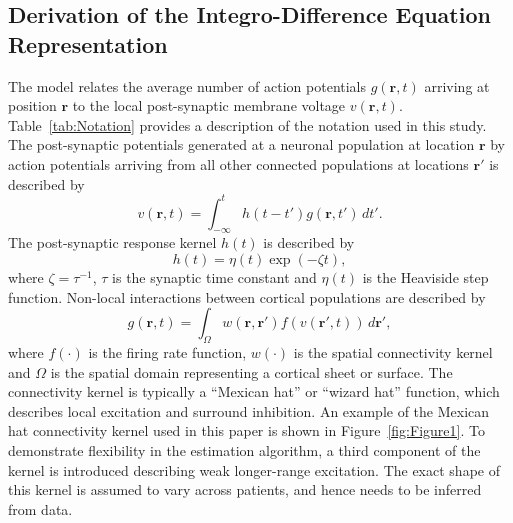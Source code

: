 \documentclass[12pt]{iopart}
\begin{document}
\subsection{Derivation of the Integro-Difference Equation Representation}
The model relates the average number of action potentials $g(\mathbf{r},t)$ arriving at position $\mathbf{r}$ to the local post-synaptic membrane voltage $v(\mathbf{r},t)$. Table~\ref{tab:Notation} provides a description of the notation used in this study. The post-synaptic potentials generated at a neuronal population at location $\mathbf{r}$ by action potentials arriving from all other connected populations at locations $\mathbf{r}'$ is described by 
\begin{equation}
	\label{SpikesToPotential} v\left( {\mathbf{r},t} \right) = \int_{ - \infty }^t {h\left( {t - t'} \right)g\left( {\mathbf{r},t'} \right) \, dt'}. 
\end{equation}
The post-synaptic response kernel $h(t)$ is described by 
\begin{equation}
	\label{SynapticRespKernel} h(t) = \eta(t)\exp{\left(-\zeta t\right)}, 
\end{equation}
where $\zeta=\tau^{-1}$, $\tau$ is the synaptic time constant and $\eta(t)$ is the Heaviside step function. Non-local interactions between cortical populations are described by 
\begin{equation}
	\label{RateBasedInteractions} g\left( \mathbf{r},t \right) = \int_\Omega {w\left( \mathbf{r},\mathbf{r}' \right)f\left( v\left( \mathbf{r}',t \right) \right)\, d\mathbf{r}'}, 
\end{equation}
where $f(\cdot)$ is the firing rate function, $w(\cdot)$ is the spatial connectivity kernel and $\Omega$ is the spatial domain representing a cortical sheet or surface. The connectivity kernel is typically a ``Mexican hat'' or ``wizard hat'' function, which describes local excitation and surround inhibition. An example of the Mexican hat connectivity kernel used in this paper is shown in Figure~\ref{fig:Figure1}. To demonstrate flexibility in the estimation algorithm, a third component of the kernel is introduced describing weak longer-range excitation. The exact shape of this kernel is assumed to vary across patients, and hence needs to be inferred from data.
\end{document}
